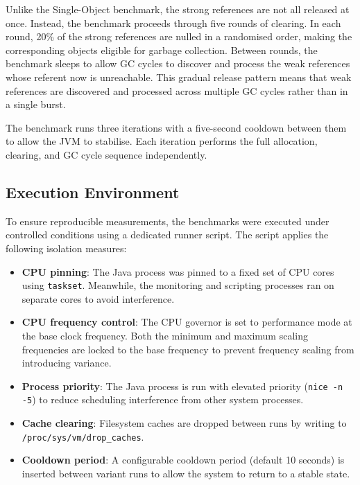 Unlike the Single-Object benchmark, the strong references are not all released at once. Instead, the benchmark proceeds through five rounds of clearing. In each round, 20\% of the strong references are nulled in a randomised order, making the corresponding objects eligible for garbage collection. Between rounds, the benchmark sleeps to allow GC cycles to discover and process the weak references whose referent now is unreachable. This gradual release pattern means that weak references are discovered and processed across multiple GC cycles rather than in a single burst.

The benchmark runs three iterations with a five-second cooldown between them to allow the JVM to stabilise. Each iteration performs the full allocation, clearing, and GC cycle sequence independently.

\subsection{Execution Environment}
\label{subsec:execution-environment}

To ensure reproducible measurements, the benchmarks were executed under controlled conditions using a dedicated runner script. The script applies the following isolation measures:

\begin{itemize}
    \item \textbf{CPU pinning}: The Java process was pinned to a fixed set of CPU cores using \texttt{taskset}. Meanwhile, the monitoring and scripting processes ran on separate cores to avoid interference.
    \item \textbf{CPU frequency control}: The CPU governor is set to performance mode at the base clock frequency. Both the minimum and maximum scaling frequencies are locked to the base frequency to prevent frequency scaling from introducing variance.
    \item \textbf{Process priority}: The Java process is run with elevated priority (\texttt{nice -n -5}) to reduce scheduling interference from other system processes.
    \item \textbf{Cache clearing}: Filesystem caches are dropped between runs by writing to \texttt{/proc/sys/vm/drop\_caches}.
    \item \textbf{Cooldown period}: A configurable cooldown period (default 10 seconds) is inserted between variant runs to allow the system to return to a stable state.
\end{itemize}

